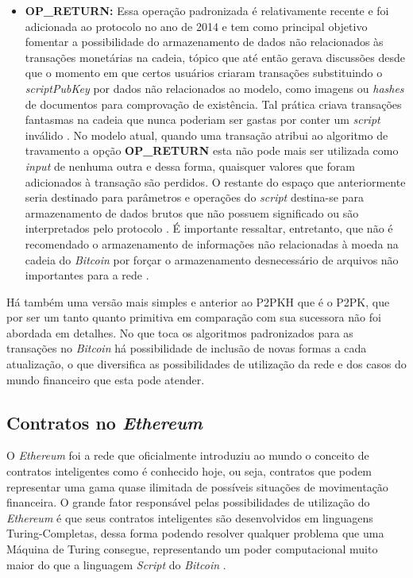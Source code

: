 \begin{itemize}
    \item \textbf{OP\_RETURN:} Essa operação padronizada é relativamente recente e foi adicionada ao protocolo no ano de 2014 \cite{smart_contracts:bitcoin_0.9} e tem como principal objetivo fomentar a possibilidade do armazenamento de dados não relacionados às transações monetárias na cadeia, tópico que até então gerava discussões desde que o momento em que certos usuários criaram transações substituindo o \textit{scriptPubKey} por dados não relacionados ao modelo, como imagens ou \textit{hashes} de documentos para comprovação de existência. Tal prática criava transações fantasmas na cadeia que nunca poderiam ser gastas por conter um \textit{script} inválido \cite{blockchain:mastering_bitcoin}. No modelo atual, quando uma transação atribui ao algoritmo de travamento a opção \textbf{OP\_RETURN} esta não pode mais ser utilizada como \textit{input} de nenhuma outra e dessa forma, quaisquer valores que foram adicionados à transação são perdidos. O restante do espaço que anteriormente seria destinado para parâmetros e operações do \textit{script} destina-se para armazenamento de dados brutos que não possuem significado ou são interpretados pelo protocolo \cite{smart_contracts:learn_me_a_bitcoin}. É importante ressaltar, entretanto, que não é recomendado o armazenamento de informações não relacionadas à moeda na cadeia do \textit{Bitcoin} por forçar o armazenamento desnecessário de arquivos não importantes para a rede  \cite{smart_contracts:bitcoin_0.9}.
\end{itemize}

Há também uma versão mais simples e anterior ao P2PKH que é o P2PK, que por ser um tanto quanto primitiva em comparação com sua sucessora não foi abordada em detalhes. No que toca os algoritmos padronizados para as transações no \textit{Bitcoin} há possibilidade de inclusão de novas formas a cada atualização, o que diversifica as possibilidades de utilização da rede e dos casos do mundo financeiro que esta pode atender. 

\subsection{Contratos no \textit{Ethereum}}

O \textit{Ethereum} foi a rede que oficialmente introduziu ao mundo o conceito de contratos inteligentes como é conhecido hoje, ou seja, contratos que podem representar uma gama quase ilimitada de possíveis situações de movimentação financeira. O grande fator responsável pelas possibilidades de utilização do \textit{Ethereum} é que seus contratos inteligentes são desenvolvidos em linguagens Turing-Completas, dessa forma podendo resolver qualquer problema que uma Máquina de Turing consegue, representando um poder computacional muito maior do que a linguagem \textit{Script} do \textit{Bitcoin} \cite{blockchain:capitulo5}.

